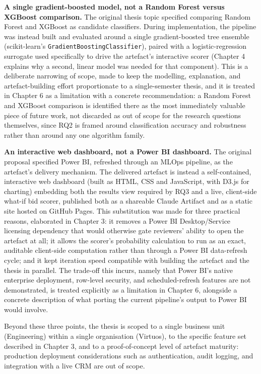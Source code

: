 \textbf{A single gradient-boosted model, not a Random Forest versus
XGBoost comparison.} The original thesis topic specified comparing
Random Forest and XGBoost as candidate classifiers. During
implementation, the pipeline was instead built and evaluated around a
single gradient-boosted tree ensemble (scikit-learn's
\texttt{GradientBoostingClassifier}), paired with a logistic-regression
surrogate used specifically to drive the artefact's interactive scorer
(Chapter 4 explains why a second, linear model was needed for that
component). This is a deliberate narrowing of scope, made to keep the
modelling, explanation, and artefact-building effort proportionate to a
single-semester thesis, and it is treated in Chapter 6 as a limitation
with a concrete recommendation: a Random Forest and XGBoost comparison
is identified there as the most immediately valuable piece of future
work, not discarded as out of scope for the research questions
themselves, since RQ2 is framed around classification accuracy and
robustness rather than around any one algorithm family.

\textbf{An interactive web dashboard, not a Power BI dashboard.} The
original proposal specified Power BI, refreshed through an MLOps
pipeline, as the artefact's delivery mechanism. The delivered artefact
is instead a self-contained, interactive web dashboard (built as HTML,
CSS and JavaScript, with D3.js for charting) embedding both the results
view required by RQ3 and a live, client-side what-if bid scorer,
published both as a shareable Claude Artifact and as a static site
hosted on GitHub Pages. This substitution was made for three practical
reasons, elaborated in Chapter 3: it removes a Power BI Desktop/Service
licensing dependency that would otherwise gate reviewers' ability to
open the artefact at all; it allows the scorer's probability calculation
to run as an exact, auditable client-side computation rather than
through a Power BI data-refresh cycle; and it kept iteration speed
compatible with building the artefact and the thesis in parallel. The
trade-off this incurs, namely that Power BI's native enterprise
deployment, row-level security, and scheduled-refresh features are not
demonstrated, is treated explicitly as a limitation in Chapter 6,
alongside a concrete description of what porting the current pipeline's
output to Power BI would involve.

Beyond these three points, the thesis is scoped to a single business
unit (Engineering) within a single organisation (Virtuos), to the
specific feature set described in Chapter 3, and to a proof-of-concept
level of artefact maturity: production deployment considerations such as
authentication, audit logging, and integration with a live CRM are out
of scope.

